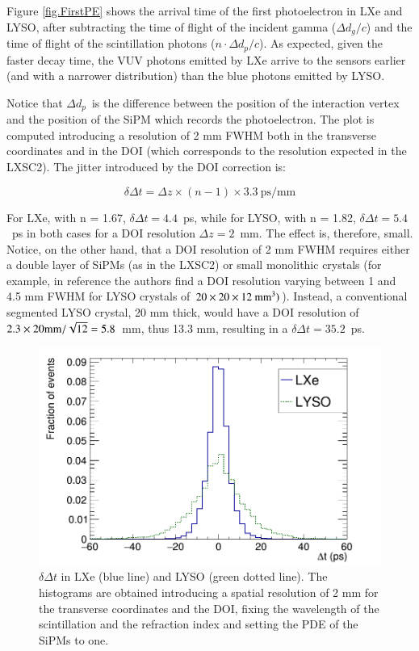 \documentclass[review]{elsarticle}
\begin{document}
Figure \ref{fig.FirstPE} shows the arrival time of the first photoelectron in LXe and LYSO, after subtracting the time of flight of the incident gamma ($\Delta d_g/c$) and the time of flight of the scintillation photons ($n \cdot \Delta d_p/c$). As expected, given the faster decay time, the VUV photons emitted by LXe arrive to the sensors earlier (and with a narrower distribution) than the blue photons emitted by LYSO. 

Notice that $\Delta d_p$~is the difference 
between the position of the interaction vertex and the position of the SiPM which records the photoelectron. 
The plot is computed introducing a resolution of 2 mm FWHM both in the transverse coordinates and
in the DOI (which corresponds to the resolution expected in the LXSC2). The jitter introduced by the DOI correction is:

\begin{equation}
\delta \Delta t =\Delta z \times (n-1) \times 3.3\ \textrm{ps/mm}
\label{eq.DOI}
\end{equation}

For LXe, with n = 1.67, $\delta \Delta t = 4.4$~ps, while for  LYSO, with n = 1.82, $\delta \Delta t = 5.4$~ps in both cases for a DOI resolution $\Delta z = 2$~mm. The effect is, therefore, small. Notice, on the other hand, that a DOI resolution of 2 mm FWHM requires either a double layer of SiPMs (as in the LXSC2) or small monolithic crystals (for example, in reference \cite{VanDamm2011} the authors find a DOI resolution varying between 1 and 4.5 mm FWHM for LYSO crystals of 
$20 \times 20 \times 12 ~{\rm mm^3})$). Instead, a conventional segmented LYSO crystal, 20 mm
thick, would have a DOI resolution of $2.3 \times 20{\rm mm}/\sqrt{12} = 5.8$~mm, thus 13.3 mm, resulting in a $\delta \Delta t = 35.2$~ps.

\begin{figure}[!bhtp]
	\centering
	\includegraphics[scale=0.36]{../img/DTOFLXeLYSO.png}
	\caption{\label{fig.dtof} $\delta \Delta t$ in LXe (blue line) and LYSO (green dotted line). The
	histograms are obtained introducing a spatial resolution of 2 mm for the transverse coordinates and
	the DOI, fixing the wavelength of the scintillation and the refraction index and setting the PDE of the SiPMs to one. }
\end{figure}
\end{document}

